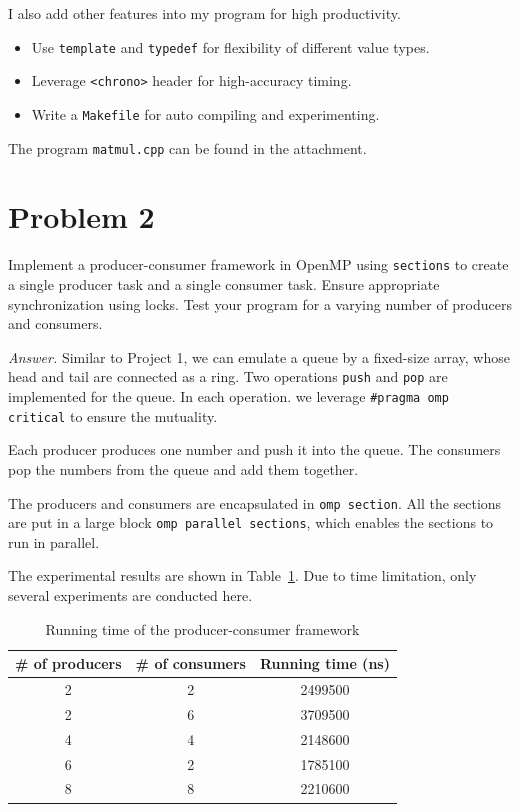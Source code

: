 \documentclass[english]{thesis}
\begin{document}
I also add other features into my program for high productivity.
\begin{itemize}
	\item Use \verb'template' and \verb'typedef' for flexibility of different value types.
	\item Leverage \verb'<chrono>' header for high-accuracy timing.
	\item Write a \verb'Makefile' for auto compiling and experimenting.
\end{itemize}

The program \verb'matmul.cpp' can be found in the attachment.

\section{Problem 2}
Implement a producer-consumer framework in OpenMP using \verb'sections' to create a single producer task and a single consumer task. Ensure appropriate synchronization using locks. Test your program for a varying number of producers and consumers.

\bigskip

\textit{Answer.}
Similar to Project 1, we can emulate a queue by a fixed-size array, whose head and tail are connected as a ring.
Two operations \verb'push' and \verb'pop' are implemented for the queue.
In each operation. we leverage \verb'#pragma omp critical' to ensure the mutuality.

Each producer produces one number and push it into the queue.
The consumers pop the numbers from the queue and add them together.

The producers and consumers are encapsulated in \verb'omp section'.
All the sections are put in a large block \verb'omp parallel sections', which enables the sections to run in parallel.

The experimental results are shown in Table~\ref{tab:results}.
Due to time limitation, only several experiments are conducted here.

\begin{table}[H]
\centering
\caption{Running time of the producer-consumer framework}
\label{tab:results}
\begin{tabular}{|c|c|c|}\hline
\textbf{\# of producers} & \textbf{\# of consumers} & \textbf{Running time (ns)}\\\hline
2 & 2 & 2499500 \\\hline
2 & 6 & 3709500 \\\hline
4 & 4 & 2148600 \\\hline
6 & 2 & 1785100 \\\hline
8 & 8 & 2210600 \\\hline
\end{tabular}
\end{table}
\end{document}
